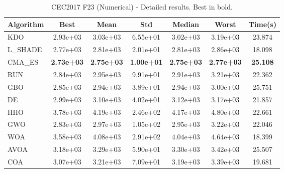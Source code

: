 \begin{table}[H]
\centering\small
\caption{CEC2017 F23 (Numerical) - Detailed results. Best in bold.}
\label{tab:cec2017_F23}
\begin{tabular}{lcccccc}
\toprule
\textbf{Algorithm} & \textbf{Best} & \textbf{Mean} & \textbf{Std} & \textbf{Median} & \textbf{Worst} & \textbf{Time(s)} \\
\midrule
KDO & 2.93e+03 & 3.03e+03 & 6.55e+01 & 3.02e+03 & 3.19e+03 & 23.874 \\
L_SHADE & 2.77e+03 & 2.81e+03 & 2.01e+01 & 2.81e+03 & 2.86e+03 & 18.098 \\
CMA_ES & \textbf{2.73e+03} & \textbf{2.75e+03} & \textbf{1.00e+01} & \textbf{2.75e+03} & \textbf{2.77e+03} & \textbf{25.108} \\
RUN & 2.84e+03 & 2.95e+03 & 9.91e+01 & 2.91e+03 & 3.21e+03 & 22.362 \\
GBO & 2.85e+03 & 2.94e+03 & 3.89e+01 & 2.94e+03 & 3.00e+03 & 25.751 \\
DE & 2.99e+03 & 3.10e+03 & 4.02e+01 & 3.12e+03 & 3.17e+03 & 21.857 \\
HHO & 3.78e+03 & 4.19e+03 & 2.46e+02 & 4.17e+03 & 4.80e+03 & 22.661 \\
GWO & 2.83e+03 & 2.97e+03 & 1.05e+02 & 2.95e+03 & 3.22e+03 & 22.046 \\
WOA & 3.58e+03 & 4.08e+03 & 2.91e+02 & 4.04e+03 & 4.64e+03 & 18.399 \\
AVOA & 3.18e+03 & 3.29e+03 & 5.90e+01 & 3.30e+03 & 3.42e+03 & 25.507 \\
COA & 3.07e+03 & 3.21e+03 & 7.09e+01 & 3.19e+03 & 3.39e+03 & 19.681 \\
\bottomrule
\end{tabular}
\end{table}
